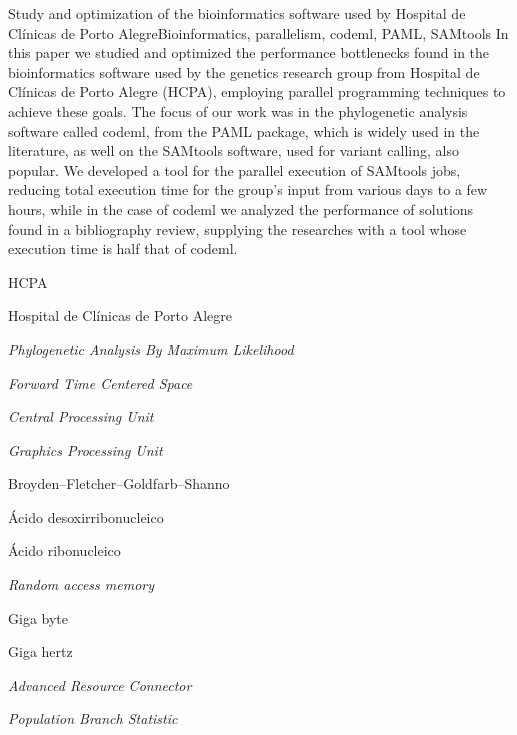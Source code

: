 \documentclass[cic,tc]{iiufrgs}
\begin{document}
\begin{englishabstract}{Study and optimization of the bioinformatics software used by Hospital de Clínicas de Porto Alegre}{Bioinformatics, parallelism, codeml, PAML, SAMtools} In this paper we studied and optimized the performance bottlenecks found in the bioinformatics software used by the genetics research group from Hospital de Clínicas de Porto Alegre (HCPA), employing parallel programming techniques to achieve these goals. The focus of our work was in the phylogenetic analysis software called codeml, from the PAML package, which is widely used in the literature, as well on the SAMtools software, used for variant calling, also popular. We developed a tool for the parallel execution of SAMtools jobs, reducing total execution time for the group's input from various days to a few hours, while in the case of codeml we analyzed the performance of solutions found in a bibliography review, supplying the researches with a tool whose execution time is half that of codeml.
\end{englishabstract}

\listoffigures

\listoftables

\begin{listofabbrv}{HCPA}
    \item[HCPA] Hospital de Clínicas de Porto Alegre
    \item[PAML] \textit{Phylogenetic Analysis By Maximum Likelihood}
    \item[FTCS] \textit{Forward Time Centered Space}
    \item[CPU] \textit{Central Processing Unit}
    \item[GPU] \textit{Graphics Processing Unit}
    \item[BFGS] Broyden–Fletcher–Goldfarb–Shanno
    \item[DNA] Ácido desoxirribonucleico
    \item[RNA] Ácido ribonucleico
    \item[RAM] \textit{Random access memory}
    \item[GB] Giga byte
    \item[GHz] Giga hertz
    \item[ARC] \textit{Advanced Resource Connector}
    \item[PBS] \textit{Population Branch Statistic}
\end{listofabbrv}
\end{document}
